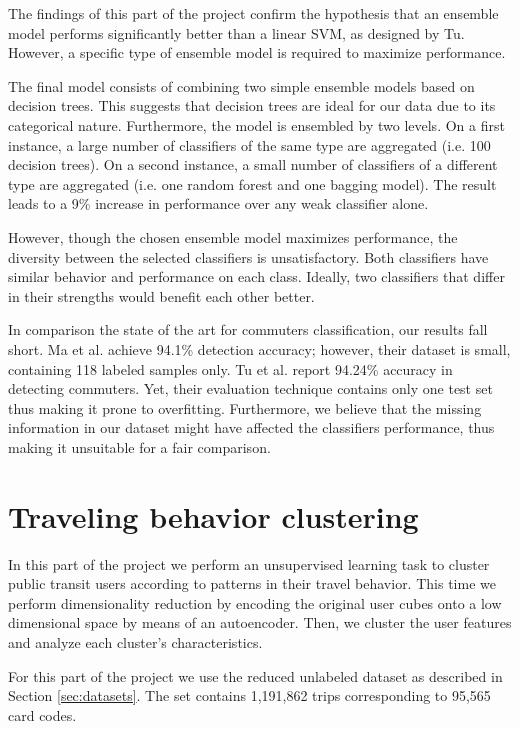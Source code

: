 \documentclass{article}
\begin{document}
The findings of this part of the project confirm the hypothesis that an ensemble model performs significantly better than a linear SVM, as designed by Tu. However, a specific type of ensemble model is required to maximize performance. 

The final model consists of combining two simple ensemble models based on decision trees. This suggests that decision trees are ideal for our data due to its categorical nature. Furthermore, the model is ensembled by two levels. On a first instance, a large number of classifiers of the same type are aggregated (i.e. 100 decision trees). On a second instance, a small number of classifiers of a different type are aggregated (i.e. one random forest and one bagging model). The result leads to a 9\% increase in performance over any weak classifier alone.  

However, though the chosen ensemble model maximizes performance, the diversity between the selected classifiers is unsatisfactory. Both classifiers have similar behavior and performance on each class. Ideally, two classifiers that differ in their strengths would benefit each other better. 

In comparison the state of the art for commuters classification, our results fall short. Ma et al. \cite{ma2017understanding} achieve 94.1\% detection accuracy; however, their dataset is small, containing 118 labeled samples only. Tu et al. \cite{tu2016impact} report 94.24\% accuracy in detecting commuters. Yet, their evaluation technique contains only one test set thus making it prone to overfitting. Furthermore, we believe that the missing information in our dataset might have affected the classifiers performance, thus making it unsuitable for a fair comparison.

\newpage
\section{Traveling behavior clustering}
\label{sec:partIII}
In this part of the project we perform an unsupervised learning task to cluster public transit users according to patterns in their travel behavior. This time we perform dimensionality reduction by encoding the original user cubes onto a low dimensional space by means of an autoencoder. Then, we cluster the user features and analyze each cluster's characteristics. 

For this part of the project we use the reduced unlabeled dataset as described in Section \ref{sec:datasets}. The set contains 1,191,862 trips corresponding to 95,565 card codes. 
\end{document}
